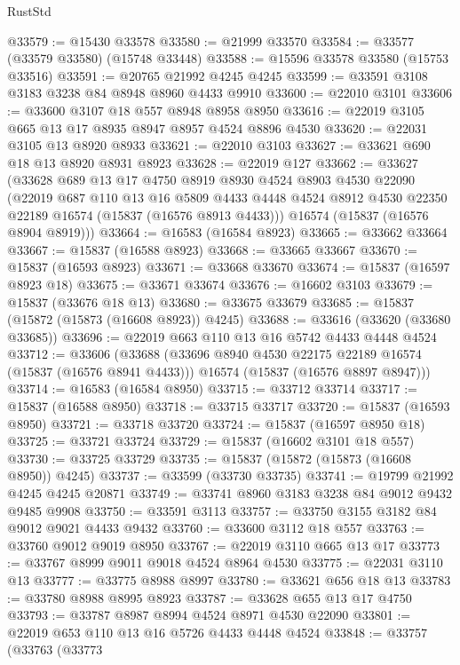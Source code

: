 \begin{lexlean}{RustStd}
\begin{coremodule}
{\begin{coremodule}
{{{{{{{{{{{{{{{{{{{{{{{{{{{{{{{{{{{{{{{{{{{{{{{{{{{{{{{{{{{{@33579 := @15430 @33578
@33580 := @21999 @33570
@33584 := @33577 (@33579 @33580) (@15748 @33448)
@33588 := @15596 @33578 @33580 (@15753 @33516)
@33591 := @20765 @21992 @4245 @4245
@33599 := @33591 @3108 @3183 @3238 @84 @8948 @8960 @4433 @9910
@33600 := @22010 @3101
@33606 := @33600 @3107 @18 @557 @8948 @8958 @8950
@33616 := @22019 @3105 @665 @13 @17 @8935 @8947 @8957 @4524 @8896 @4530
@33620 := @22031 @3105 @13 @8920 @8933
@33621 := @22010 @3103
@33627 := @33621 @690 @18 @13 @8920 @8931 @8923
@33628 := @22019 @127
@33662 := @33627
    (@33628
      @689
      @13
      @17
      @4750
      @8919
      @8930
      @4524
      @8903
      @4530
      @22090
      (@22019
        @687
        @110
        @13
        @16
        @5809
        @4433
        @4448
        @4524
        @8912
        @4530
        @22350
        @22189
        @16574
        (@15837 (@16576 @8913 @4433)))
      @16574
      (@15837 (@16576 @8904 @8919)))
@33664 := @16583 (@16584 @8923)
@33665 := @33662 @33664
@33667 := @15837 (@16588 @8923)
@33668 := @33665 @33667
@33670 := @15837 (@16593 @8923)
@33671 := @33668 @33670
@33674 := @15837 (@16597 @8923 @18)
@33675 := @33671 @33674
@33676 := @16602 @3103
@33679 := @15837 (@33676 @18 @13)
@33680 := @33675 @33679
@33685 := @15837 (@15872 (@15873 (@16608 @8923)) @4245)
@33688 := @33616 (@33620 (@33680 @33685))
@33696 := @22019 @663 @110 @13 @16 @5742 @4433 @4448 @4524
@33712 := @33606
    (@33688
      (@33696 @8940 @4530 @22175 @22189 @16574 (@15837 (@16576 @8941 @4433)))
      @16574
      (@15837 (@16576 @8897 @8947)))
@33714 := @16583 (@16584 @8950)
@33715 := @33712 @33714
@33717 := @15837 (@16588 @8950)
@33718 := @33715 @33717
@33720 := @15837 (@16593 @8950)
@33721 := @33718 @33720
@33724 := @15837 (@16597 @8950 @18)
@33725 := @33721 @33724
@33729 := @15837 (@16602 @3101 @18 @557)
@33730 := @33725 @33729
@33735 := @15837 (@15872 (@15873 (@16608 @8950)) @4245)
@33737 := @33599 (@33730 @33735)
@33741 := @19799 @21992 @4245 @4245 @20871
@33749 := @33741 @8960 @3183 @3238 @84 @9012 @9432 @9485 @9908
@33750 := @33591 @3113
@33757 := @33750 @3155 @3182 @84 @9012 @9021 @4433 @9432
@33760 := @33600 @3112 @18 @557
@33763 := @33760 @9012 @9019 @8950
@33767 := @22019 @3110 @665 @13 @17
@33773 := @33767 @8999 @9011 @9018 @4524 @8964 @4530
@33775 := @22031 @3110 @13
@33777 := @33775 @8988 @8997
@33780 := @33621 @656 @18 @13
@33783 := @33780 @8988 @8995 @8923
@33787 := @33628 @655 @13 @17 @4750
@33793 := @33787 @8987 @8994 @4524 @8971 @4530 @22090
@33801 := @22019 @653 @110 @13 @16 @5726 @4433 @4448 @4524
@33848 := @33757
    (@33763
      (@33773
}}}}}}}}}}}}}}}}}}}}}}}}}}}}}}}}}}}}}}}}}}}}}}}}}}}}}}}}}}}}
\end{coremodule}}
\end{coremodule}
\end{lexlean}

